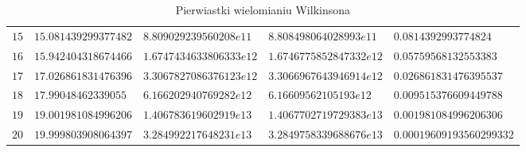 \documentclass[12pt]{article}
\begin{document}
\begin{table}[h!]
\begin{adjustwidth}{-1cm}{}
\begin{tabularx}{1.1\textwidth}{l l l l l }
                $15$ & $15.081439299377482$ & $8.809029239560208e11$ & $8.808498064028993e11$ & $0.0814392993774824$ \\
                $16$ & $15.942404318674466$ & $1.6747434633806333e12$ & $1.6746775852847332e12$ & $0.05759568132553383$ \\
                $17$ & $17.026861831476396$ & $3.3067827086376123e12$ & $3.3066967643946914e12$ & $0.026861831476395537$ \\
                $18$ & $17.99048462339055$ & $6.166202940769282e12$ & $6.16609562105193e12$ & $0.009515376609449788$ \\
                $19$ & $19.001981084996206$ & $1.406783619602919e13$ & $1.4067702719729383e13$ & $0.001981084996206306$ \\
                $20$ & $19.999803908064397$ & $3.284992217648231e13$ & $3.2849758339688676e13$ & $0.00019609193560299332$ \\
                \hline
            \end{tabularx}
            \label{table:Wilkinson}
            \caption{Pierwiastki wielomianiu Wilkinsona}
            \end{adjustwidth}
        \end{table}

        \newpage
\end{document}
